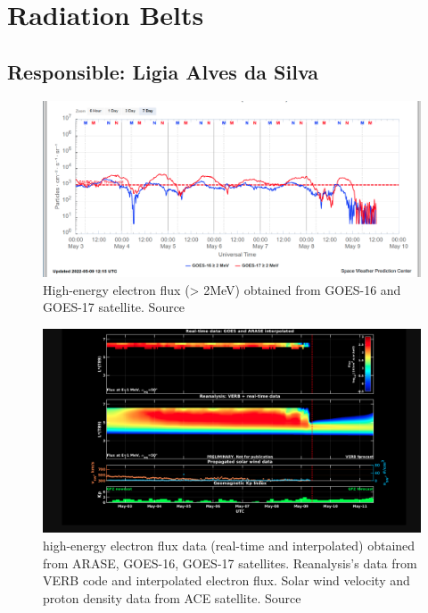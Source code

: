 \documentclass[a4paper, 10pt]{article}
\begin{document}
\section{Radiation Belts} 
 \subsection{Responsible: Ligia Alves da Silva} 
 
\begin{figure}[H]
    
                        \centering
   
                             \includegraphics[width=14cm]{./figures//figureRadBelts_0.png}

                             \caption{ High-energy electron flux (> 2MeV) obtained from GOES-16 and GOES-17 satellite. Source}
                        \end{figure}

                     \begin{figure}[H]
    
                        \centering
   
                             \includegraphics[width=14cm]{./figures//figureRadBelts_1.png}

                             \caption{ high-energy electron flux data (real-time and interpolated) obtained from ARASE, GOES-16, GOES-17 satellites. Reanalysis’s data from VERB code and interpolated electron flux. Solar wind velocity and proton density data from ACE satellite. Source}
                        \end{figure}
\end{document}
